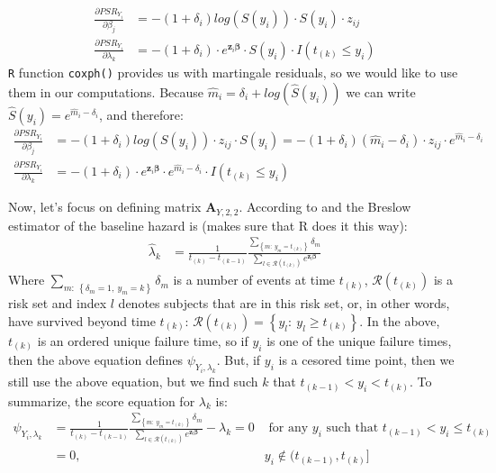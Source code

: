 \documentclass[]{article}
\begin{document}
$$
  \begin{aligned}
    \frac{\partial PSR_{Y_i}}{\partial \beta_j} &=  -(1+\delta_i)log\left(S(y_i)\right) \cdot  S(y_i) \cdot  z_{ij} \\
    \frac{\partial PSR_{Y_i}}{\partial \lambda_k} &=  -(1+\delta_i)\cdot  e^{\pmb{z}_i\pmb{\beta}}   \cdot  S(y_i) \cdot I(t_{(k)}\leq y_i)
  \end{aligned}
  $$
\texttt{R} function \texttt{coxph()} provides us with martingale residuals, so we would like to use them in our computations. Because $\hat{m}_i = \delta_i + log\left(\hat{S}(y_i) \right)$ we can write $\hat{S}(y_i) = e^{\hat{m}_i - \delta_i} $, and therefore: 
  $$
  \begin{aligned}
    \frac{\partial PSR_{Y_i}}{\partial \beta_j} &=  -(1+\delta_i)log\left(S(y_i)\right) \cdot  z_{ij}  \cdot  S(y_i)=  -(1+\delta_i)\left(\hat{m}_i - \delta_i \right) \cdot  z_{ij}  \cdot  e^{\hat{m}_i - \delta_i}\\
    \frac{\partial PSR_{Y_i}}{\partial \lambda_k} &= - (1+\delta_i)\cdot  e^{\pmb{z}_i\pmb{\beta}}   \cdot  e^{\hat{m}_i - \delta_i}\cdot I(t_{(k)}\leq y_i)
  \end{aligned}
  $$
  
  


Now, let's focus on defining matrix $\pmb{A}_{Y,2,2}$. According to \cite{breslow1972discussion} and \cite{lin2007breslow} the Breslow estimator of the baseline hazard is (makes sure that R does it this way): 
  $$
  \begin{aligned}
    \hat{\lambda}_k &= \frac{1}{t_{(k)} - t_{(k-1)}} \frac{\sum_{\left\{m:~y_m = t_{(k)}\right\}} \delta_m}{\sum_{l\in \mathcal{R}(t_{(k)})} e^{\pmb{z}_l\pmb{\beta}}}
  \end{aligned}
  $$
Where $\sum_{m:~ \left\{\delta_m=1,~ y_m = k\right\}} \delta_m$ is a number of events at time $t_{(k)}$, $\mathcal{R}(t_{(k)})$ is a risk set and index $l$ denotes subjects that are in this risk set, or, in other words, have survived beyond time $t_{(k)}$: $\mathcal{R}(t_{(k)}) = \left\{y_l: ~y_l \geq t_{(k)} \right\}$. In the above, $t_{(k)}$ is an ordered unique failure time, so if $y_i$ is one of the unique failure times, then the above equation defines $\psi_{Y_i,{\lambda}_k}$. But, if $y_i$ is a cesored time point, then we still use the above equation, but we find such $k$ that $t_{(k-1)} < y_i < t_{(k)}$. To summarize, the score equation for $\lambda_k$ is:
  $$
  \begin{aligned}
    \psi_{Y_i,{\lambda}_k} &= \frac{1}{t_{(k)} - t_{(k-1)}}  \frac{\sum_{\left\{m:~y_m = t_{(k)}\right\}} \delta_m}{\sum_{l\in \mathcal{R}(t_{(k)})} e^{\pmb{z}_l\pmb{\beta}}}- \lambda_k = 0  &\text{ for any } y_i \text{ such that } t_{(k-1)} < y_i \leq t_{(k)}\\
    &=0,~~ &y_i \notin (t_{(k-1)}, t_{(k)}]
  \end{aligned}
  $$
\end{document}
